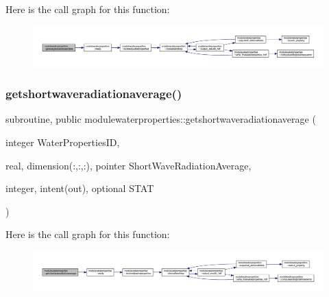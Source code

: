 Here is the call graph for this function\+:\nopagebreak
\begin{figure}[H]
\begin{center}
\leavevmode
\includegraphics[width=350pt]{namespacemodulewaterproperties_ae3241f210c7340a59547a54db80870aa_cgraph}
\end{center}
\end{figure}
\mbox{\label{namespacemodulewaterproperties_a821377ba47455562f8f8a055ad136a15}} 
\subsubsection{\texorpdfstring{getshortwaveradiationaverage()}{getshortwaveradiationaverage()}}
{\footnotesize\ttfamily subroutine, public modulewaterproperties\+::getshortwaveradiationaverage (\begin{DoxyParamCaption}\item[{integer}]{Water\+Properties\+ID,  }\item[{real, dimension(\+:,\+:,\+:), pointer}]{Short\+Wave\+Radiation\+Average,  }\item[{integer, intent(out), optional}]{S\+T\+AT }\end{DoxyParamCaption})}

Here is the call graph for this function\+:\nopagebreak
\begin{figure}[H]
\begin{center}
\leavevmode
\includegraphics[width=350pt]{namespacemodulewaterproperties_a821377ba47455562f8f8a055ad136a15_cgraph}
\end{center}
\end{figure}
\mbox{\label{namespacemodulewaterproperties_ae8ca73c7b0b0c01064b13ed994d0935c}} 
